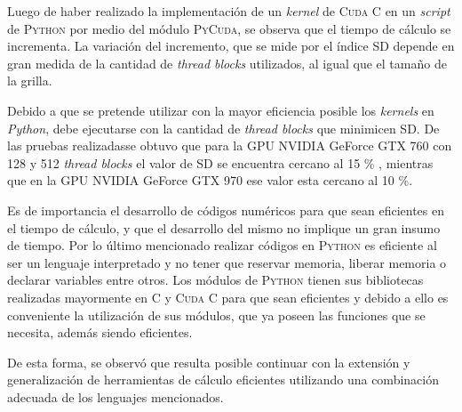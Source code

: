 
\newpage
Luego de haber realizado la implementación de un \textit{kernel} de \textsc{Cuda C} en un \textit{script} de \textsc{Python} por medio del módulo \textsc{PyCuda}, se observa que el tiempo de cálculo se incrementa. La variación del incremento, que se mide por el índice SD depende en gran medida de la cantidad de \textit{thread blocks} utilizados, al igual que el tamaño de la grilla.

Debido a que se pretende utilizar con la mayor eficiencia posible los \textit{kernels} en \textit{Python}, debe ejecutarse con la cantidad de \textit{thread blocks} que minimicen SD. De las pruebas realizadasse obtuvo que para la GPU NVIDIA GeForce GTX 760 con 128 y 512  \textit{thread blocks} el valor de SD se encuentra cercano al 15 \% , mientras que en la GPU NVIDIA GeForce GTX 970 ese valor esta cercano al 10 \%.

Es de importancia el desarrollo de códigos numéricos para que sean eficientes en el tiempo de cálculo, y que el desarrollo del mismo no implique un gran insumo de tiempo. Por lo último mencionado realizar códigos en \textsc{Python} es eficiente al ser un lenguaje interpretado y no tener que reservar memoria, liberar memoria o declarar variables entre otros. Los módulos de \textsc{Python} tienen sus bibliotecas realizadas mayormente en \textsc{C} y \textsc{Cuda C} para que sean eficientes y debido a ello es conveniente la utilización de sus módulos, que ya poseen las funciones que se necesita, además siendo eficientes. 

De esta forma, se observó que resulta posible continuar con la extensión y generalización de herramientas de cálculo eficientes utilizando una combinación adecuada de los lenguajes mencionados.





